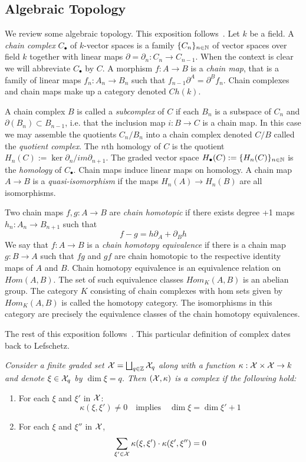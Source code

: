 \subsection{Algebraic Topology}\label{sec:prelims:AT}

We review some algebraic topology.  This exposition follows~\cite{weibel}.  Let $k$ be a field.  A {\em chain complex} $C_\bullet$ of $k$-vector spaces is a family $\{C_n\}_{n\in {\mathbb{N}}}$ of vector spaces over field $k$ together with linear maps $\partial=\partial_n:C_n\to C_{n-1}$.  When the context is clear we will abbreviate $C_\bullet$ by $C$.  A morphism $f:A\to B$ is a {\em chain map}, that is a family of linear maps $f_n:A_n\to B_n$ such that $f_{n-1}\partial^A = \partial^B f_n$. Chain complexes and chain maps make up a category denoted $Ch(k)$.  

A chain complex $B$ is called a {\em subcomplex} of $C$ if each $B_n$ is a subspace of $C_n$ and $\partial(B_n)\subset B_{n-1}$, i.e. that the inclusion map $i:B\to C$ is a chain map.  In this case we may assemble the quotients $C_n/B_n$ into a chain complex denoted $C/B$ called the {\em quotient complex}.   The $n$th homology of $C$ is the quotient $H_n(C):= \ker \partial_n/im \partial_{n+1}$.  The graded vector space $H_\bullet(C) := \{H_n(C)\}_{n\in {\mathbb{N}}}$ is the {\em homology} of $C_\bullet$.  Chain maps induce linear maps on homology.  A chain map $A\to B$ is a {\em quasi-isomorphism} if the maps $H_n(A)\to H_n(B)$ are all isomorphisms.

Two chain maps $f,g:A\to B$ are {\em chain homotopic} if there exists degree +1 maps $h_n:A_n\to B_{n+1}$ such that $$f-g = h\partial_A+\partial_Bh$$  We say that $f:A\to B$ is a {\em chain homotopy equivalence} if there is a chain map $g:B\to A$ such that $fg$ and $gf$ are chain homotopic to the respective identity maps of $A$ and $B$.  Chain homotopy equivalence is an equivalence relation on $Hom(A,B)$.  The set of such equivalence classes $Hom_K(A,B)$ is an abelian group.  The category $K$ consisting of chain complexes with hom sets given by $Hom_K(A,B)$ is called the homotopy category.  The isomorphisms in this category are precisely the equivalence classes of the chain homotopy equivalences.


The rest of this exposition follows~\cite{focm,mn}.  This particular definition of complex dates back to Lefschetz.

\begin{defn}
{\em
Consider a finite graded set ${\mathcal X} = \bigsqcup_{q\in {\mathbb{Z}}} {\mathcal X}_q$ along with a function $\kappa:{\mathcal X}\times{\mathcal X}\to k$ and denote $\xi\in {\mathcal X}_q$ by $\dim \xi = q$.  Then $({\mathcal X},\kappa)$ is a {\em complex} if the following hold:
\begin{enumerate}
\item \label{cond:1} For each $\xi$ and $\xi'$ in ${\mathcal X}$:
$$\kappa(\xi,\xi')\neq 0\quad\text{implies}\quad \dim \xi = \dim \xi'+1$$
\item\label{cond:2} For each $\xi$ and $\xi''$ in ${\mathcal X}$,
$$\sum_{\xi'\in {\mathcal X}} \kappa(\xi,\xi')\cdot \kappa(\xi',\xi'')=0$$
\end{enumerate}
}
\end{defn}

